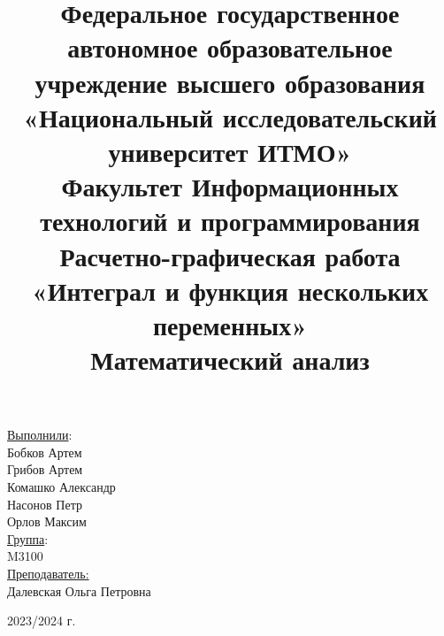 \title{Федеральное государственное автономное образовательное учреждение высшего образования\\
«Национальный исследовательский университет ИТМО»\\
Факультет Информационных технологий и программирования\\[2\baselineskip]
Расчетно-графическая работа\\
\textbf{«Интеграл и функция нескольких переменных»}\\
Математический анализ\\
}
\date{}
\author{}

\maketitle

\thispagestyle{empty}
\vfill
\begin{flushright}
  \begin{large}
\underline{Выполнили}:\\
Бобков Артем\\
Грибов Артем\\
Комашко Александр\\
Насонов Петр\\
Орлов Максим\\[1\baselineskip]

\underline{Группа}:\\
M3100 \Cat \\[1\baselineskip]
\underline{Преподаватель:}\\
Далевская Ольга Петровна\\[3\baselineskip]

\end{large}

\end{flushright}
\begin{center} \begin{normalsize} 2023/2024 г. \\\end{normalsize} \end{center}

\clearpage

\pagestyle{plain}
